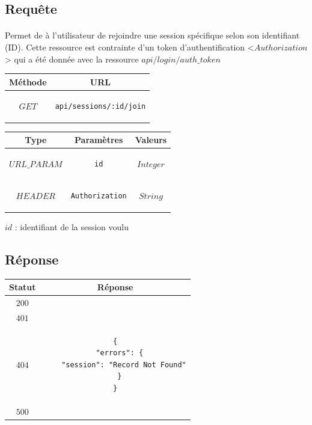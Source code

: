 \documentclass[titlepage, 12pt]{report}
\begin{document}
\subsection{Requête}

\paragraph{} Permet de à l'utilisateur de rejoindre une session spécifique selon son identifiant (ID). Cette ressource est contrainte d'un token d'authentification <$Authorization$> qui a été donnée avec la ressource $api/login/auth\_token$

\begin{center}
	\begin{tabular}{|c|c|}
	\hline
	Méthode & URL \\
	\hline
	$ GET $ 
	&
	\begin{lstlisting}
api/sessions/:id/join
	\end{lstlisting} 
	\\ \hline
	\end{tabular}
\end{center}


\begin{center}
	\begin{tabular}{|c|c|c|}
	\hline
	Type & Paramètres & Valeurs \\ \hline
	$ URL\_PARAM $ & 
	\begin{lstlisting}
id
	\end{lstlisting} &
	$ Integer $ \\ \hline
	$ HEADER $ & 
	\begin{lstlisting}
Authorization
	\end{lstlisting} &
	$ String $ \\ \hline
	
	\end{tabular}
\end{center}

\par $ id $ : identifiant de la session voulu
\subsection{Réponse}

\begin{center}
	\begin{tabular}{|c|c|}
		\hline
		Statut & Réponse \\
		\hline
		$ 200 $ & \\ 
		\hline
		$ 401 $ & \\
		\hline
		$ 404 $ & \begin{lstlisting}
{
  "errors": {
    "session": "Record Not Found"
  }
}
		\end{lstlisting} \\
		\hline
		$ 500 $ & \\
		\hline
	\end{tabular}
\end{center}
\end{document}
